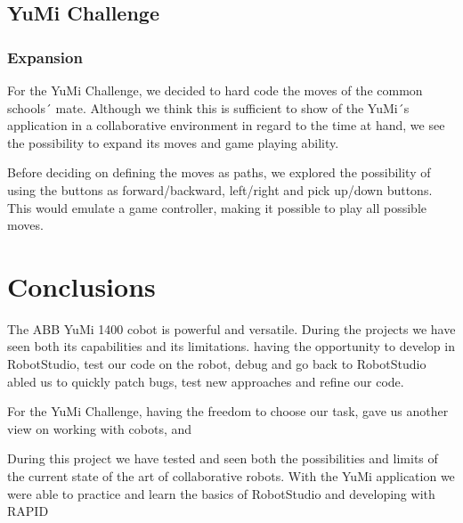 \documentclass[a4paper,12pt]{article}
\begin{document}
\subsection{YuMi Challenge}
\subsubsection{Expansion}
For the YuMi Challenge, we decided to hard code the moves of the common schools´ mate. Although we think this is sufficient to show of the YuMi´s application in a collaborative environment in regard to the time at hand, we see the possibility to expand its moves and game playing ability. 

Before deciding on defining the moves as paths, we explored the possibility of using the buttons as forward/backward, left/right and pick up/down buttons. This would emulate a game controller, making it possible to play all possible moves.  


\section{Conclusions} 
The ABB YuMi 1400 cobot is powerful and versatile. During the projects we have seen both its capabilities and its limitations. 
having the opportunity  to develop in RobotStudio, test our code on the robot, debug and go back to RobotStudio abled us to quickly patch bugs, test new approaches and refine our code. 

For the YuMi Challenge, having the freedom to choose our task, gave us another view on working with cobots, and 

During this project we have tested and seen both the possibilities and limits of the current state of the art of collaborative robots. With the YuMi application we were able to practice and learn the basics of RobotStudio and developing with RAPID
\end{document}
